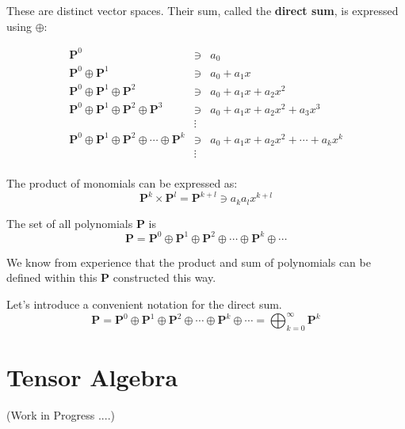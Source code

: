 \documentclass[uplatex,a4j,12pt,dvipdfmx]{jsarticle}
\begin{document}
These are distinct vector spaces. Their sum, called the \textbf{direct sum}, is expressed using $\oplus$:

\[
	\begin{array}{rcl}
		\mathbf{P}^{0}                                                                                 & \ni    & a_{0}                                                \\
		\mathbf{P}^{0} \oplus \mathbf{P}^{1}                                                           & \ni    & a_{0} + a_{1} x                                      \\
		\mathbf{P}^{0} \oplus \mathbf{P}^{1} \oplus \mathbf{P}^{2}                                     & \ni    & a_{0} + a_{1} x + a_{2} x^{2}                        \\
		\mathbf{P}^{0} \oplus \mathbf{P}^{1} \oplus \mathbf{P}^{2} \oplus \mathbf{P}^{3}               & \ni    & a_{0} + a_{1} x + a_{2} x^{2} + a_{3} x^{3}          \\
		                                                                                               & \vdots &                                                      \\
		\mathbf{P}^{0} \oplus \mathbf{P}^{1} \oplus \mathbf{P}^{2} \oplus \cdots \oplus \mathbf{P}^{k} & \ni    & a_{0} + a_{1} x + a_{2} x^{2} + \cdots + a_{k} x^{k} \\
		                                                                                               & \vdots &                                                      \\
	\end{array}
\]

The product of monomials can be expressed as:
$$
	\mathbf{P}^{k} \times \mathbf{P}^{l} = \mathbf{P}^{k+l} \ni a_{k} a_{l} x^{k+l}
$$

The set of all polynomials $\mathbf{P}$ is
$$
	\mathbf{P}
	=
	\mathbf{P}^{0} \oplus \mathbf{P}^{1} \oplus \mathbf{P}^{2} \oplus \cdots \oplus \mathbf{P}^{k} \oplus \cdots
$$

We know from experience that the product and sum of polynomials can be defined within this $\mathbf{P}$ constructed this way.

Let's introduce a convenient notation for the direct sum.
$$
	\mathbf{P}
	=
	\mathbf{P}^{0} \oplus \mathbf{P}^{1} \oplus \mathbf{P}^{2} \oplus \cdots \oplus \mathbf{P}^{k} \oplus \cdots
	=
	\displaystyle \bigoplus_{k=0}^{\infty} \mathbf{P}^{k}
$$

\section{Tensor Algebra}


 (Work in Progress ....)
\end{document}
